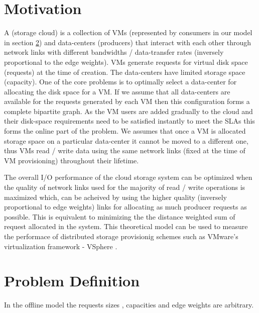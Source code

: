 \documentclass{llncs}
\begin{document}
\section{Motivation}
\label{sec:motivation}
A (storage cloud) is a collection of VMs (represented by consumers in our model in section \ref{sec:problem-definition}) and data-centers (producers) that interact with each other through network links with different bandwidths / data-transfer rates (inversely proportional to the edge weights). VMs generate requests for virtual disk space (requests) at the time of creation. The data-centers have limited storage space (capacity). One of the core problems is to optimally select a data-center for allocating the disk space for a VM. If we assume that all data-centers are available for the requests generated by each VM then this configuration forms a complete bipartite graph. As the VM users are added gradually to the cloud and their disk-space requirements need to be satisfied instantly to meet the SLAs this forms the online part of the problem. We assumes that once a VM is allocated storage space on a particular data-center it cannot be moved to a different one, thus VMs read / write data using the same network links (fixed at the time of VM provisioning) throughout their lifetime.

The overall I/O performance of the cloud storage system can be optimized when the quality of network links used for the majority of read / write operations is maximized which, can be acheived by using the higher quality (inversely proportional to edge weights) links for allocating as much producer requests as possible. This is equivalent to minimizing the the distance weighted sum of request allocated in the system. This theoretical model can be used to measure the performace of distributed storage provisionig schemes such as VMware's virtualization framework - VSphere \cite{vmware-drs,vmware-scale-storage}.

\section{Problem Definition}
\label{sec:problem-definition}


In the offline model  the requests sizes , capacities  and edge weights  are arbitrary.
\end{document}
